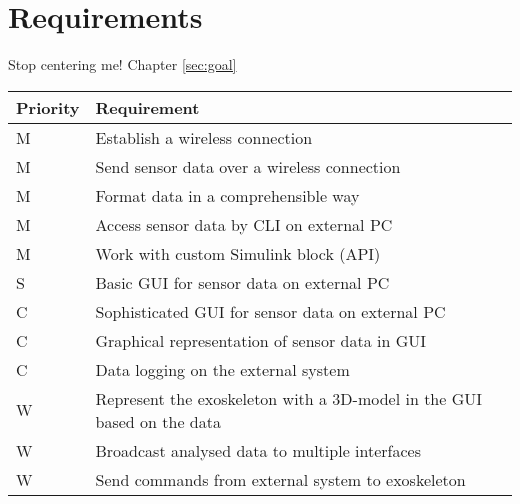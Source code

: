 \section{Requirements}
Stop centering me! Chapter \ref{sec:goal}\\

{\renewcommand{\arraystretch}{1.5}
	\centering
	\begin{tabular}{ | l | l | }
		\hline
		\bfseries{Priority} & \bfseries{Requirement} \\ \hline
		M & Establish a wireless connection \\ \hline
		M & Send sensor data over a wireless connection \\ \hline
		M & Format data in a comprehensible way \\ \hline
		M & Access sensor data by CLI on external PC \\ \hline
		M & Work with custom Simulink block (API) \\ \hline
		S & Basic GUI for sensor data on external PC \\ \hline
		C & Sophisticated GUI for sensor data on external PC\\ \hline
		C & Graphical representation of sensor data in GUI\\ \hline
		C & Data logging on the external system \\ \hline
		W & Represent the exoskeleton with a 3D-model in the GUI based on the data \\ \hline
		W & Broadcast analysed data to multiple interfaces \\ \hline 
		W & Send commands from external system to exoskeleton \\ \hline 
	\end{tabular}
	\label{table:requi}
}